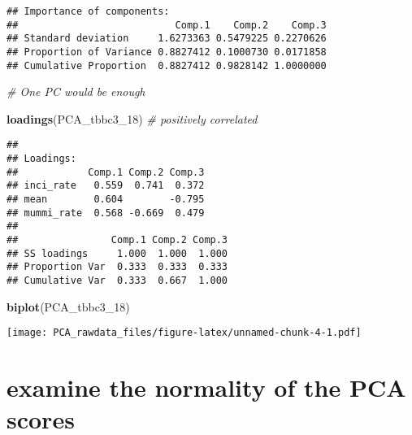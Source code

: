 \documentclass[]{article}
\newenvironment{Shaded}{\begin{snugshade}}{\end{snugshade}}
\newcommand{\CommentTok}[1]{\textcolor[rgb]{0.56,0.35,0.01}{\textit{#1}}}
\newcommand{\DecValTok}[1]{\textcolor[rgb]{0.00,0.00,0.81}{#1}}
\newcommand{\KeywordTok}[1]{\textcolor[rgb]{0.13,0.29,0.53}{\textbf{#1}}}
\newcommand{\NormalTok}[1]{#1}
\newcommand{\OperatorTok}[1]{\textcolor[rgb]{0.81,0.36,0.00}{\textbf{#1}}}
\newcommand{\StringTok}[1]{\textcolor[rgb]{0.31,0.60,0.02}{#1}}
\begin{document}
\begin{verbatim}
## Importance of components:
##                           Comp.1    Comp.2    Comp.3
## Standard deviation     1.6273363 0.5479225 0.2270626
## Proportion of Variance 0.8827412 0.1000730 0.0171858
## Cumulative Proportion  0.8827412 0.9828142 1.0000000
\end{verbatim}

\begin{Shaded}
\begin{Highlighting}[]
\CommentTok{# One PC would be enough}

\KeywordTok{loadings}\NormalTok{(PCA_tbbc3_}\DecValTok{18}\NormalTok{) }\CommentTok{# positively correlated}
\end{Highlighting}
\end{Shaded}

\begin{verbatim}
## 
## Loadings:
##            Comp.1 Comp.2 Comp.3
## inci_rate   0.559  0.741  0.372
## mean        0.604        -0.795
## mummi_rate  0.568 -0.669  0.479
## 
##                Comp.1 Comp.2 Comp.3
## SS loadings     1.000  1.000  1.000
## Proportion Var  0.333  0.333  0.333
## Cumulative Var  0.333  0.667  1.000
\end{verbatim}

\begin{Shaded}
\begin{Highlighting}[]
\KeywordTok{biplot}\NormalTok{(PCA_tbbc3_}\DecValTok{18}\NormalTok{)}
\end{Highlighting}
\end{Shaded}

\texttt{[image: PCA\_rawdata\_files/figure-latex/unnamed-chunk-4-1.pdf]}

\hypertarget{examine-the-normality-of-the-pca-scores}{%
\section{examine the normality of the PCA
scores}\label{examine-the-normality-of-the-pca-scores}}

\begin{Shaded}
\end{Shaded}
\end{document}
